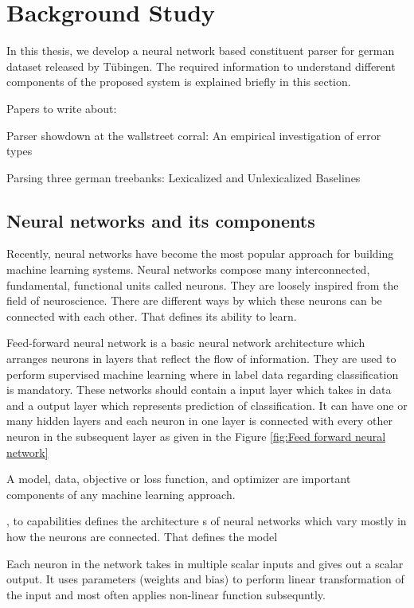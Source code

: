 \documentclass[a4paper, 11pt]{article}
\begin{document}

\section{Background Study}
In this thesis, we develop a neural network based constituent parser for german dataset released by Tübingen. The required information to understand different components of the proposed system is explained briefly in this section. 

Papers to write about:

Parser showdown at the wallstreet corral: An empirical investigation of error types

Parsing three german treebanks: Lexicalized and Unlexicalized Baselines


\subsection{Neural networks and its components}

Recently, neural networks have become the most popular approach for building machine learning systems. Neural networks compose many interconnected, fundamental, functional units called neurons. They are loosely inspired from the field of neuroscience. There are different ways by which these neurons can be connected with each other. That defines its ability to learn. 

Feed-forward neural network \parencite{Svozil1997} is a basic neural network architecture which arranges neurons in layers that reflect the flow of information. They are used to perform supervised machine learning where in label data regarding classification is mandatory. These networks should contain a input layer which takes in data and a output layer which represents prediction of classification. It can have one or many hidden layers and each neuron in one layer is connected with every other neuron in the subsequent layer as given in the Figure \ref{fig:Feed forward neural network}

A model, data, objective or loss function, and optimizer are important components of any machine learning approach.

,  to capabilities defines the architecture s of neural networks which vary mostly in how the neurons are connected. That defines the model

Each neuron in the network takes in multiple scalar inputs and gives out a scalar output. It uses parameters (weights and bias) to perform linear transformation of the input and most often applies non-linear function subsequntly.
\end{document}
